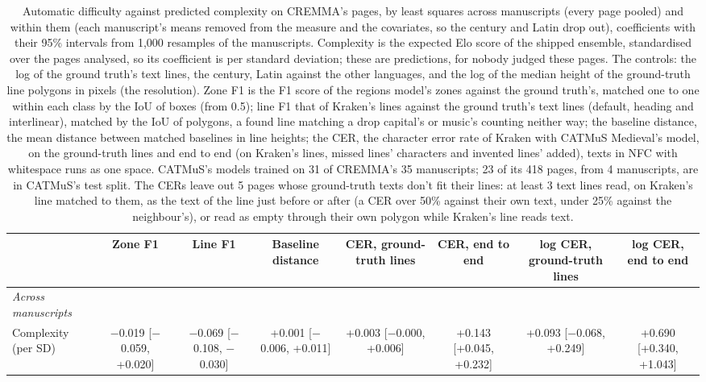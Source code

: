 \begin{table}[htbp]
  \centering
  \caption{Automatic difficulty against predicted complexity on CREMMA's pages, by least squares across manuscripts (every page pooled) and within them (each manuscript's means removed from the measure and the covariates, so the century and Latin drop out), coefficients with their 95\% intervals from 1,000 resamples of the manuscripts. Complexity is the expected Elo score of the shipped ensemble, standardised over the pages analysed, so its coefficient is per standard deviation; these are predictions, for nobody judged these pages. The controls: the log of the ground truth's text lines, the century, Latin against the other languages, and the log of the median height of the ground-truth line polygons in pixels (the resolution). Zone F1 is the F1 score of the regions model's zones against the ground truth's, matched one to one within each class by the IoU of boxes (from 0.5); line F1 that of Kraken's lines against the ground truth's text lines (default, heading and interlinear), matched by the IoU of polygons, a found line matching a drop capital's or music's counting neither way; the baseline distance, the mean distance between matched baselines in line heights; the CER, the character error rate of Kraken with CATMuS Medieval's model, on the ground-truth lines and end to end (on Kraken's lines, missed lines' characters and invented lines' added), texts in NFC with whitespace runs as one space. CATMuS's models trained on 31 of CREMMA's 35 manuscripts; 23 of its 418 pages, from 4 manuscripts, are in CATMuS's test split. The CERs leave out 5 pages whose ground-truth texts don't fit their lines: at least 3 text lines read, on Kraken's line matched to them, as the text of the line just before or after (a CER over 50\% against their own text, under 25\% against the neighbour's), or read as empty through their own polygon while Kraken's line reads text.}
  \label{tab:difficulty_regression_across_and_within}
  \begin{tabular}{lccccccc}
    \toprule
     & Zone F1 & Line F1 & Baseline distance & CER, ground-truth lines & CER, end to end & log CER, ground-truth lines & log CER, end to end \\
    \midrule
    \textit{Across manuscripts} &  &  &  &  &  &  &  \\
    Complexity (per SD) & $-$0.019 [$-$0.059, +0.020] & $-$0.069 [$-$0.108, $-$0.030] & +0.001 [$-$0.006, +0.011] & +0.003 [$-$0.000, +0.006] & +0.143 [+0.045, +0.232] & +0.093 [$-$0.068, +0.249] & +0.690 [+0.340, +1.043] \\

\end{tabular}
\end{table}
